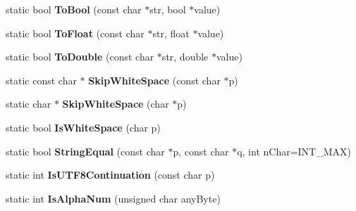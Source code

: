 \begin{DoxyCompactItemize}
\item 
\mbox{\label{classtinyxml2_1_1XMLUtil_ae5b03e0a1ca5d42052a7ac540f7aa12a}} 
static bool {\bfseries To\+Bool} (const char $\ast$str, bool $\ast$value)
\item 
\mbox{\label{classtinyxml2_1_1XMLUtil_a399e71edb5f29d61ea81d91ee0332bb9}} 
static bool {\bfseries To\+Float} (const char $\ast$str, float $\ast$value)
\item 
\mbox{\label{classtinyxml2_1_1XMLUtil_ad8f75ac140fb19c1c6e164a957c4cd53}} 
static bool {\bfseries To\+Double} (const char $\ast$str, double $\ast$value)
\item 
\mbox{\label{classtinyxml2_1_1XMLUtil_a9333d20f2a34325b5115ca45849c4b2a}} 
static const char $\ast$ {\bfseries Skip\+White\+Space} (const char $\ast$p)
\item 
\mbox{\label{classtinyxml2_1_1XMLUtil_aa48025be8843ec5a79b65579d31bd8fc}} 
static char $\ast$ {\bfseries Skip\+White\+Space} (char $\ast$p)
\item 
\mbox{\label{classtinyxml2_1_1XMLUtil_a357ec3af8fc433d19023a815f45e8e33}} 
static bool {\bfseries Is\+White\+Space} (char p)
\item 
\mbox{\label{classtinyxml2_1_1XMLUtil_acfcd287cacfd2533e1bc9ea4dfb56602}} 
static bool {\bfseries String\+Equal} (const char $\ast$p, const char $\ast$q, int n\+Char=I\+N\+T\+\_\+\+M\+AX)
\item 
\mbox{\label{classtinyxml2_1_1XMLUtil_a24ba87b1d22528167a3d16c4f52096bf}} 
static int {\bfseries Is\+U\+T\+F8\+Continuation} (const char p)
\item 
\mbox{\label{classtinyxml2_1_1XMLUtil_ac921fe9ab2ddefe073ed9eed5108ffe6}} 
static int {\bfseries Is\+Alpha\+Num} (unsigned char any\+Byte)
\item 
\mbox{\label{classtinyxml2_1_1XMLUtil_a102c0ecacf6e728b118e82d2b70ab49d}} 

\end{DoxyCompactItemize}
